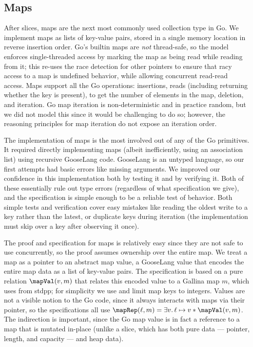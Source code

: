 \subsection{Maps}


After slices, maps are the next most commonly used collection type in
Go. We implement maps as lists of key-value pairs, stored in a single
memory location in reverse insertion order. Go's builtin maps are
\emph{not} thread-safe, so the model enforces single-threaded access by
marking the map as being read while reading from it; this re-uses the
race detection for other pointers to ensure that racy access to a map is
undefined behavior, while allowing concurrent read-read access. Maps
support all the Go operations: insertions, reads (including returning
whether the key is present),  to get the number of elements
in the map, deletion, and iteration. Go map iteration is
non-deterministic and in practice random, but we did not model this
since it would be challenging to do so; however, the reasoning
principles for map iteration do not expose an iteration order.

The implementation of maps is the most involved out of any of the Go
primitives. It required directly implementing maps (albeit
inefficiently, using an association list) using recursive GooseLang
code. GooseLang is an untyped language, so our first attempts had basic
errors like missing arguments. We improved our confidence in this
implementation both by testing it and by verifying it. Both of these
essentially rule out type errors (regardless of what specification we give),
and the specification is simple enough
to be a reliable test of behavior. Both simple tests and verification
cover easy mistakes like reading the oldest write to a key rather than
the latest, or duplicate keys during iteration (the implementation must
skip over a key after observing it once).

The proof and specification for maps is relatively easy since they are
not safe to use concurrently, so the proof assumes ownership over the entire map. We
treat a map as a pointer to an abstract map value, a GooseLang value
that encodes the entire map data as a list of key-value pairs. The
specification is based on a pure relation $\mapVal(v, m)$ that relates
this encoded value to a Gallina map $m$, which uses  from
stdpp; for simplicity we use  and limit map
keys to integers. Values are not a visible notion to the Go code, since
it always interacts with maps via their pointer, so the specifications
all use $\mapRep(\ell, m) = \exists v.\, \ell \mapsto v * \mapVal(v, m)$. The
indirection is important, since the Go map value
 is in fact a reference to a map that is
mutated in-place (unlike a slice, which has both pure data --- pointer,
length, and capacity --- and heap data).

